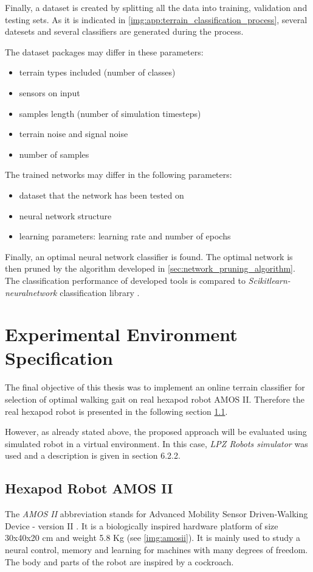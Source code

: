 Finally, a dataset is created by splitting all the data into training, validation and testing sets. As it is indicated in \cref{img:app:terrain_classification_process}, several datesets and several classifiers are generated during the process. 

The dataset packages may differ in these parameters:
\begin{itemize}
\item terrain types included (number of classes)
\item sensors on input
\item samples length (number of simulation timesteps)
\item terrain noise and signal noise
\item number of samples
\end{itemize}

The trained networks may differ in the following parameters:
\begin{itemize}
\item dataset that the network has been tested on
\item neural network structure
\item learning parameters: learning rate and number of epochs
\end{itemize}

Finally, an optimal neural network classifier is found. The optimal network is then pruned by the algorithm developed in \cref{sec:network_pruning_algorithm}. The classification performance of developed tools is compared to \textit{Scikitlearn-neuralnetwork} classification library \citep{misc:sknn}.

\section{Experimental Environment Specification} \label{sec:experimental_environment}
The final objective of this thesis was to implement an online terrain classifier for selection of optimal walking gait on real hexapod robot AMOS II. Therefore the real hexapod robot is presented in the following section \ref{ssec:amosii}.

However, as already stated above, the proposed approach will be evaluated using simulated robot in a virtual environment. In this case, \textit{LPZ Robots simulator} \citep{misc:lpzrobots} was used and a description is given in section 6.2.2.

\subsection{Hexapod Robot AMOS II} \label{ssec:amosii}
The \textit{AMOS II} abbreviation stands for Advanced Mobility Sensor Driven-Walking Device - version II \citep{misc:amosii}. It is a biologically inspired hardware platform of size 30x40x20 cm and weight 5.8 Kg (see \cref{img:amosii}). It is mainly used to study a neural control, memory and learning for machines with many degrees of freedom. The body and parts of the robot are inspired by a cockroach.

